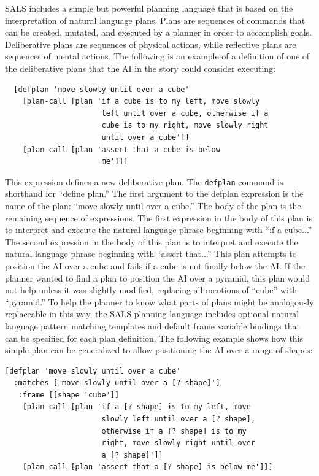 SALS includes a simple but powerful planning language that is based on
the interpretation of natural language plans.  Plans are sequences of
commands that can be created, mutated, and executed by a planner in
order to accomplish goals.  Deliberative plans are sequences of
physical actions, while reflective plans are sequences of mental
actions.  The following is an example of a definition of one of the
deliberative plans that the AI in the story could consider executing:
\begin{samepage}
\begin{Verbatim}
  [defplan 'move slowly until over a cube'
    [plan-call [plan 'if a cube is to my left, move slowly
                      left until over a cube, otherwise if a
                      cube is to my right, move slowly right
                      until over a cube']]
    [plan-call [plan 'assert that a cube is below
                      me']]]
\end{Verbatim}
\end{samepage}
This expression defines a new deliberative plan.  The {\tt{defplan}}
command is shorthand for ``define plan.''  The first argument to the
defplan expression is the name of the plan: ``move slowly until over a
cube.''  The body of the plan is the remaining sequence of
expressions.  The first expression in the body of this plan is to
interpret and execute the natural language phrase beginning with ``if
a cube...''  The second expression in the body of this plan is to
interpret and execute the natural language phrase beginning with
``assert that...''  This plan attempts to position the AI over a cube
and fails if a cube is not finally below the AI.  If the planner
wanted to find a plan to position the AI over a pyramid, this plan
would not help unless it was slightly modified, replacing all mentions
of ``cube'' with ``pyramid.''  To help the planner to know what parts
of plans might be analogously replaceable in this way, the SALS
planning language includes optional natural language pattern matching
templates and default frame variable bindings that can be specified
for each plan definition.  The following example shows how this simple
plan can be generalized to allow positioning the AI over a range of
shapes:
\begin{samepage}
\begin{Verbatim}
[defplan 'move slowly until over a cube'
  :matches ['move slowly until over a [? shape]']
   :frame [[shape 'cube']]
    [plan-call [plan 'if a [? shape] is to my left, move
                      slowly left until over a [? shape],
                      otherwise if a [? shape] is to my
                      right, move slowly right until over
                      a [? shape]']]
    [plan-call [plan 'assert that a [? shape] is below me']]]
\end{Verbatim}
\end{samepage}
